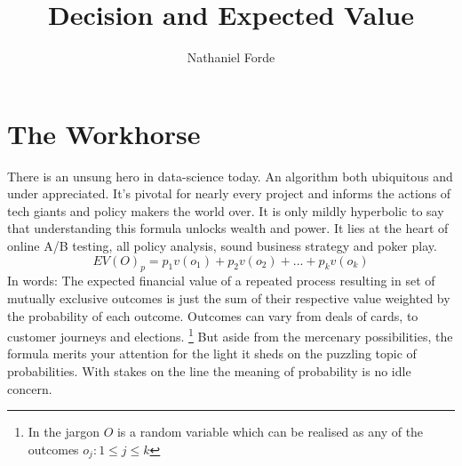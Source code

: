 \documentclass[10pt,a4paper,notitlepage,twocolumn]{article}
\author{Nathaniel Forde}
\title{Decision and Expected Value}
\begin{document}
\section*{The Workhorse}

There is an unsung hero in data-science today. An algorithm  both ubiquitous and under appreciated. It's pivotal for nearly every project and informs the actions of tech giants and policy makers the world over. It is only mildly hyperbolic to say that understanding this formula unlocks wealth and power. It lies at the heart of online A/B testing, all policy analysis, sound business strategy and poker play.
$$ EV(O)_{p} = p_{1}v(o_{1}) + p_{2}v(o_{2}) + ... + p_{k}v(o_{k}) $$
In words: The expected financial value of a repeated process resulting in set of mutually exclusive outcomes is just the sum of their respective value weighted by the probability of each outcome. Outcomes can vary from deals of cards, to customer journeys and elections. \footnote{In the jargon $O$ is a random variable which can be realised as any of the outcomes  $ o_{j} :  1 \leq j \leq k$} 
But aside from the mercenary possibilities, the formula merits your attention for the light it sheds on the puzzling topic of probabilities. With stakes on the line the meaning of probability is no idle concern.
\end{document}

